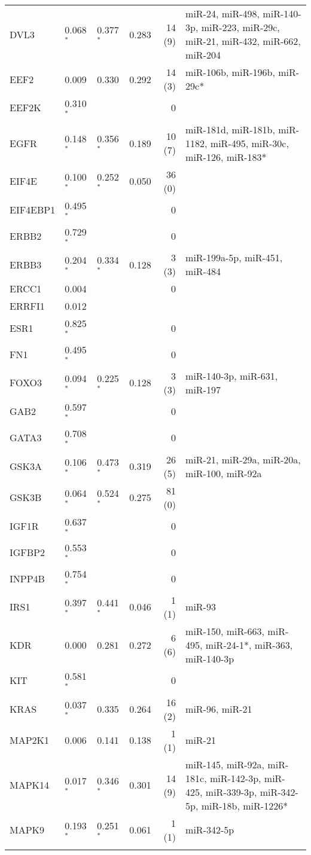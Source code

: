 {{\begin{longtable}{llllrp{7cm}}
DVL3&0.068$^{\ast}$&0.377$^{\ast}$&0.283&14 (9)&\raggedright{miR-24, miR-498, miR-140-3p, miR-223, miR-29c, miR-21, miR-432, miR-662, miR-204} \tabularnewline\rowcolor[rgb]{0.96,0.96,0.96}{}%
EEF2&0.009&0.330&0.292&14 (3)&\raggedright{miR-106b, miR-196b, miR-29c*} \tabularnewline{}%
EEF2K&0.310$^{\ast}$&&&0&\raggedright{} \tabularnewline\rowcolor[rgb]{0.96,0.96,0.96}{}%
EGFR&0.148$^{\ast}$&0.356$^{\ast}$&0.189&10 (7)&\raggedright{miR-181d, miR-181b, miR-1182, miR-495, miR-30c, miR-126, miR-183*} \tabularnewline{}%
EIF4E&0.100$^{\ast}$&0.252$^{\ast}$&0.050&36 (0)&\raggedright{} \tabularnewline\rowcolor[rgb]{0.96,0.96,0.96}{}%
EIF4EBP1&0.495$^{\ast}$&&&0&\raggedright{} \tabularnewline{}%
ERBB2&0.729$^{\ast}$&&&0&\raggedright{} \tabularnewline\rowcolor[rgb]{0.96,0.96,0.96}{}%
ERBB3&0.204$^{\ast}$&0.334$^{\ast}$&0.128&3 (3)&\raggedright{miR-199a-5p, miR-451, miR-484} \tabularnewline{}%
ERCC1&0.004&&&0&\raggedright{} \tabularnewline\rowcolor[rgb]{0.96,0.96,0.96}{}%
ERRFI1&0.012&&&&\raggedright{} \tabularnewline{}%
ESR1&0.825$^{\ast}$&&&0&\raggedright{} \tabularnewline\rowcolor[rgb]{0.96,0.96,0.96}{}%
FN1&0.495$^{\ast}$&&&0&\raggedright{} \tabularnewline{}%
FOXO3&0.094$^{\ast}$&0.225$^{\ast}$&0.128&3 (3)&\raggedright{miR-140-3p, miR-631, miR-197} \tabularnewline\rowcolor[rgb]{0.96,0.96,0.96}{}%
GAB2&0.597$^{\ast}$&&&0&\raggedright{} \tabularnewline{}%
GATA3&0.708$^{\ast}$&&&0&\raggedright{} \tabularnewline\rowcolor[rgb]{0.96,0.96,0.96}{}%
GSK3A&0.106$^{\ast}$&0.473$^{\ast}$&0.319&26 (5)&\raggedright{miR-21, miR-29a, miR-20a, miR-100, miR-92a} \tabularnewline{}%
GSK3B&0.064$^{\ast}$&0.524$^{\ast}$&0.275&81 (0)&\raggedright{} \tabularnewline\rowcolor[rgb]{0.96,0.96,0.96}{}%
IGF1R&0.637$^{\ast}$&&&0&\raggedright{} \tabularnewline{}%
IGFBP2&0.553$^{\ast}$&&&0&\raggedright{} \tabularnewline\rowcolor[rgb]{0.96,0.96,0.96}{}%
INPP4B&0.754$^{\ast}$&&&0&\raggedright{} \tabularnewline{}%
IRS1&0.397$^{\ast}$&0.441$^{\ast}$&0.046&1 (1)&\raggedright{miR-93} \tabularnewline\rowcolor[rgb]{0.96,0.96,0.96}{}%
KDR&0.000&0.281&0.272&6 (6)&\raggedright{miR-150, miR-663, miR-495, miR-24-1*, miR-363, miR-140-3p} \tabularnewline{}%
KIT&0.581$^{\ast}$&&&0&\raggedright{} \tabularnewline\rowcolor[rgb]{0.96,0.96,0.96}{}%
KRAS&0.037$^{\ast}$&0.335&0.264&16 (2)&\raggedright{miR-96, miR-21} \tabularnewline{}%
MAP2K1&0.006&0.141&0.138&1 (1)&\raggedright{miR-21} \tabularnewline\rowcolor[rgb]{0.96,0.96,0.96}{}%
MAPK14&0.017$^{\ast}$&0.346$^{\ast}$&0.301&14 (9)&\raggedright{miR-145, miR-92a, miR-181c, miR-142-3p, miR-425, miR-339-3p, miR-342-5p, miR-18b, miR-1226*} \tabularnewline{}%
MAPK9&0.193$^{\ast}$&0.251$^{\ast}$&0.061&1 (1)&\raggedright{miR-342-5p} \tabularnewline\rowcolor[rgb]{0.96,0.96,0.96}{}%

\end{longtable}}}

